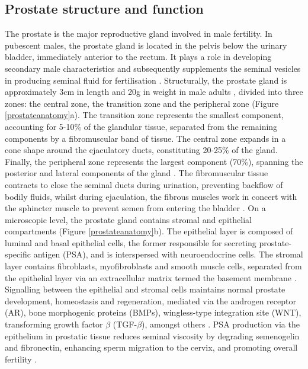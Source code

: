 \subsection{Prostate structure and function}
The prostate is the major reproductive gland involved in male fertility. In pubescent males, the prostate gland is located in the pelvis below the urinary bladder, immediately anterior to the rectum. It plays a role in developing secondary male characteristics and subsequently supplements the seminal vesicles in producing seminal fluid for fertilisation \cite{Verze2016Jul}. Structurally, the prostate gland is approximately 3cm in length and 20g in weight in male adults \cite{Almeeri2024Nov}, divided into three zones: the central zone, the transition zone and the peripheral zone (Figure \ref{prostateanatomy}a). The transition zone represents the smallest component, accounting for 5-10\% of the glandular tissue, separated from the remaining components by a fibromuscular band of tissue. The central zone expands in a cone shape around the ejaculatory ducts, constituting 20-25\% of the gland. Finally, the peripheral zone represents the largest component (70\%), spanning the posterior and lateral components of the gland \cite{Verze2016Jul}. The fibromuscular tissue contracts to close the seminal ducts during urination, preventing backflow of bodily fluids, whilst during ejaculation, the fibrous muscles work in concert with the sphincter muscle to prevent semen from entering the bladder \cite{IQWiG2022Sep}. On a microscopic level, the prostate gland contains stromal and epithelial compartments (Figure \ref{prostateanatomy}b). The epithelial layer is composed of luminal and basal epithelial cells, the former responsible for secreting prostate-specific antigen (PSA), and is interspersed with neuroendocrine cells. The stromal layer contains fibroblasts, myofibroblasts and smooth muscle cells, separated from the epithelial layer via an extracellular matrix termed the basement membrane \cite{Pitzen2023Apr}. Signalling between the epithelial and stromal cells maintains normal prostate development, homeostasis and regeneration, mediated via the androgen receptor (AR), bone morphogenic proteins (BMPs), wingless-type integration site (WNT), transforming growth factor $\beta$ (TGF-$\beta$), amongst others \cite{Prins2008May}. PSA production via the epithelium in prostatic tissue reduces seminal viscosity by degrading semenogelin and fibronectin, enhancing sperm migration to the cervix, and promoting overall fertility \cite{Lilja1988}. 

